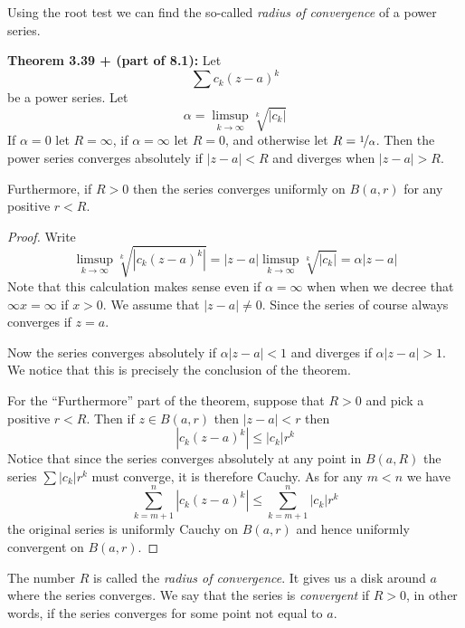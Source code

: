 \documentclass[12pt]{book}
\newcommand{\abs}[1]{\left\lvert {#1} \right\rvert}
\theoremstyle{plain}
\theoremstyle{remark}
\theoremstyle{definition}
\theoremstyle{exercise}
\theoremstyle{example}
\begin{document}
Using the root test we can find the so-called \emph{radius of convergence} of
a power series.

\medskip

\textbf{Theorem 3.39 + (part of 8.1):} Let $$\sum c_k {(z-a)}^k$$ be a power series.  Let
$$
\alpha = \limsup_{k\to\infty} \sqrt[k]{\abs{c_k}}
$$
If $\alpha = 0$ let $R=\infty$, if $\alpha = \infty$ let $R = 0$, and 
otherwise let $R = \nicefrac{1}{\alpha}$.  Then the power series converges
absolutely if $\abs{z-a} < R$ and diverges when $\abs{z-a} > R$.

Furthermore, if $R > 0$ then the series converges uniformly on $B(a,r)$ for
any positive $r < R$.

\medskip

\begin{proof}
Write
$$
\limsup_{k\to\infty} \sqrt[k]{\abs{c_k {(z-a)}^k}}
=
\abs{z-a}
\limsup_{k\to\infty} \sqrt[k]{\abs{c_k}}
=
\alpha \abs{z-a}
$$
Note that this calculation makes sense even if $\alpha = \infty$ when
when we decree that $\infty x = \infty$ if $x > 0$.  We assume
that $\abs{z-a} \not= 0$.  Since the series of course always converges if
$z=a$.

Now the series converges absolutely if
$\alpha \abs{z-a} < 1$ and diverges if
$\alpha \abs{z-a} > 1$.  We notice that this is precisely the conclusion of the theorem.

For the ``Furthermore'' part of the theorem, suppose that $R > 0$ and pick
a positive $r < R$.  Then if $z \in B(a,r)$ then $\abs{z-a} < r$ then
\begin{equation*}
\abs{c_k{(z-a)}^k} \leq \abs{c_k} r^k
\end{equation*}
Notice that since the series converges absolutely at any point in $B(a,R)$
the series $\sum \abs{c_k} r^k$ must converge, it is therefore Cauchy.
As for any $m < n$ we have
\begin{equation*}
\sum_{k=m+1}^n\abs{c_k{(z-a)}^k} \leq \sum_{k=m+1}^n \abs{c_k} r^k
\end{equation*}
the original series is uniformly Cauchy on $B(a,r)$ and hence uniformly
convergent on $B(a,r)$.
\end{proof}

\medskip

The number $R$ is called the \emph{radius of convergence}.  It gives us a disk
around $a$ where the series converges.  We say that the series is
\emph{convergent} if $R > 0$, in other words, if the series converges for
some point not equal to $a$.
\end{document}
